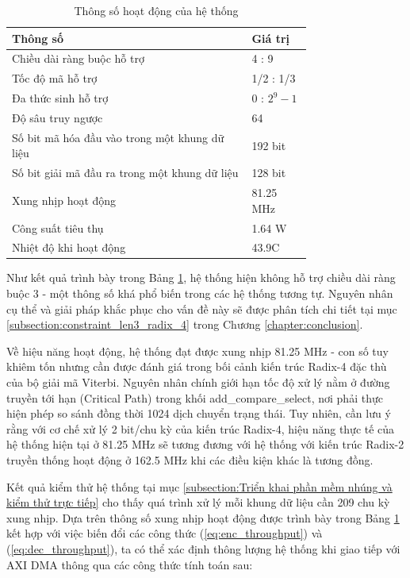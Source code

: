 \documentclass[../DoAn.tex]{subfiles}
\begin{document}
\begin{table}[H]
\centering{}
    \caption{Thông số hoạt động của hệ thống}
    \begin{tabular}{|p{0.6\linewidth}|p{0.15\linewidth}|}
        \hline
        \textbf{Thông số} & \textbf{Giá trị}\\ \hline\hline
        Chiều dài ràng buộc hỗ trợ  & 4 : 9           \\ \hline
        Tốc độ mã hỗ trợ  & 1/2 : 1/3 \\ \hline
        Đa thức sinh hỗ trợ   &  0 : $2^{9} -1$ \\ \hline
        Độ sâu truy ngược  & 64 \\ \hline
        Số bit mã hóa đầu vào trong một khung dữ liệu & 192 bit \\ \hline
        Số bit giải mã đầu ra trong một khung dữ liệu & 128 bit \\ \hline
        Xung nhịp hoạt động & 81.25 MHz \\ \hline
        Công suất tiêu thụ & 1.64 W \\ \hline
        Nhiệt độ khi hoạt động & 43.9\textdegree{}C \\ \hline
        \end{tabular}
        \label{table:Thông số hoạt động của hệ thống}
\end{table}

Như kết quả trình bày trong Bảng \ref{table:Thông số hoạt động của hệ thống}, hệ thống hiện không hỗ trợ chiều dài ràng buộc 3 - một thông số khá phổ biến trong các hệ thống tương tự. Nguyên nhân cụ thể và giải pháp khắc phục cho vấn đề này sẽ được phân tích chi tiết tại mục \ref{subsection:constraint_len3_radix_4} trong Chương \ref{chapter:conclusion}.

Về hiệu năng hoạt động, hệ thống đạt được xung nhịp 81.25 MHz - con số tuy khiêm tốn nhưng cần được đánh giá trong bối cảnh kiến trúc Radix-4 đặc thù của bộ giải mã Viterbi. Nguyên nhân chính giới hạn tốc độ xử lý nằm ở đường truyền tới hạn (Critical Path) trong khối add\_compare\_select, nơi phải thực hiện phép so sánh đồng thời 1024 dịch chuyển trạng thái. Tuy nhiên, cần lưu ý rằng với cơ chế xử lý 2 bit/chu kỳ của kiến trúc Radix-4, hiệu năng thực tế của hệ thống hiện tại ở 81.25 MHz sẽ tương đương với hệ thống với kiến trúc Radix-2 truyền thống hoạt động ở 162.5 MHz khi các điều kiện khác là tương đồng.

Kết quả kiểm thử hệ thống tại mục \ref{subsection:Triển khai phần mềm nhúng và kiểm thử trực tiếp} cho thấy quá trình xử lý mỗi khung dữ liệu cần 209 chu kỳ xung nhịp. Dựa trên thông số xung nhịp hoạt động được trình bày trong Bảng \ref{table:Thông số hoạt động của hệ thống} kết hợp với việc biến đổi các công thức (\ref{eq:enc_throughput}) và (\ref{eq:dec_throughput}), ta có thể xác định thông lượng hệ thống khi giao tiếp với AXI DMA thông qua các công thức tính toán sau:
\end{document}
